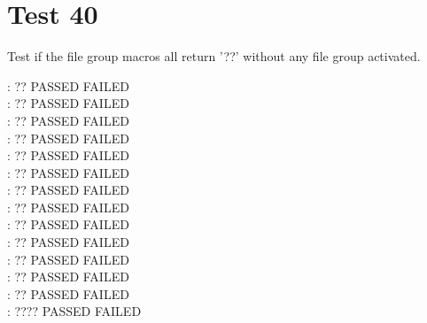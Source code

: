 \documentclass[12pt]{report}
\begin{document}
\chapter{Test 40}
Test if the file group macros all return '??' without any file group activated.

\def\qq{??}

\def\testqq#1{%
\edef\testarg{#1}
\noindent\string#1:
\ifx\testarg\qq
PASSED
\else
FAILED
\show\testarg\error{#1}\fi%
\\
}

\testqq{\svncfgrev}
\testqq{\svncfgdate}
\testqq{\svncfgauthor}
\testqq{\svncfgyear}
\testqq{\svncfgmonth}
\testqq{\svncfgday}
\testqq{\svncfghour}
\testqq{\svncfgminute}
\testqq{\svncfgsecond}
\testqq{\svncfgtimezonehour}
\testqq{\svncfgtimezoneminute}

\testqq{\svncfgtoday}

\testqq{\svnfg{}{}}

\def\qq{????}
\testqq{\svncfgtimezone}
\end{document}
